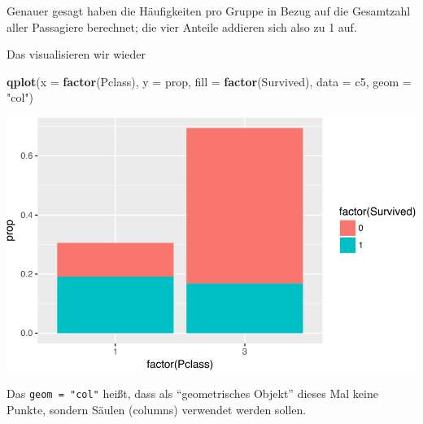 \documentclass[12pt,]{book}
\newenvironment{Shaded}{\begin{snugshade}}{\end{snugshade}}
\newcommand{\KeywordTok}[1]{\textcolor[rgb]{0.13,0.29,0.53}{\textbf{{#1}}}}
\newcommand{\DataTypeTok}[1]{\textcolor[rgb]{0.13,0.29,0.53}{{#1}}}
\newcommand{\DecValTok}[1]{\textcolor[rgb]{0.00,0.00,0.81}{{#1}}}
\newcommand{\StringTok}[1]{\textcolor[rgb]{0.31,0.60,0.02}{{#1}}}
\newcommand{\CommentTok}[1]{\textcolor[rgb]{0.56,0.35,0.01}{\textit{{#1}}}}
\newcommand{\NormalTok}[1]{{#1}}
\begin{document}
\begin{Shaded}
\end{Shaded}

Genauer gesagt haben die Häufigkeiten pro Gruppe in Bezug auf die
Gesamtzahl aller Passagiere berechnet; die vier Anteile addieren sich
also zu 1 auf.

Das visualisieren wir wieder

\begin{Shaded}
\begin{Highlighting}[]
\KeywordTok{qplot}\NormalTok{(}\DataTypeTok{x =} \KeywordTok{factor}\NormalTok{(Pclass), }\DataTypeTok{y =} \NormalTok{prop, }\DataTypeTok{fill =} \KeywordTok{factor}\NormalTok{(Survived), }\DataTypeTok{data =} \NormalTok{c5, }\DataTypeTok{geom =} \StringTok{"col"}\NormalTok{)}
\end{Highlighting}
\end{Shaded}

\begin{center}\includegraphics[width=0.7\linewidth]{075_Fallstudie_Titanic_files/figure-latex/unnamed-chunk-11-1} \end{center}

Das \texttt{geom\ =\ "col"} heißt, dass als ``geometrisches Objekt''
dieses Mal keine Punkte, sondern Säulen (columns) verwendet werden
sollen.
\end{document}
